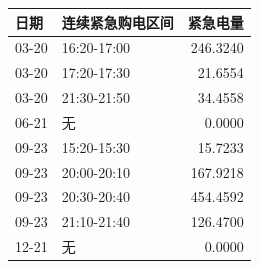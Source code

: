 \begin{tabular}{llr}
\toprule
日期 & 连续紧急购电区间 & 紧急电量 \\
\midrule
03-20 & 16:20-17:00 & 246.3240 \\
03-20 & 17:20-17:30 & 21.6554 \\
03-20 & 21:30-21:50 & 34.4558 \\
06-21 & 无 & 0.0000 \\
09-23 & 15:20-15:30 & 15.7233 \\
09-23 & 20:00-20:10 & 167.9218 \\
09-23 & 20:30-20:40 & 454.4592 \\
09-23 & 21:10-21:40 & 126.4700 \\
12-21 & 无 & 0.0000 \\
\bottomrule
\end{tabular}
